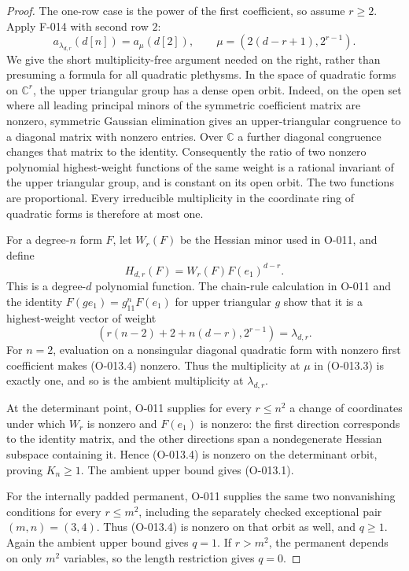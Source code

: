 \begin{proof}
The one-row case is the power of the first coefficient, so
assume $r\geq2$. Apply F-014 with second row $2$:
\[
 a_{\lambda_{d,r}}(d[n])=
 a_{\mu}(d[2]),\qquad
       \mu=(2(d-r+1),2^{r-1}).
                                                        \tag{O-013.3}
\]
We give the short multiplicity-free argument needed on the
right, rather than presuming a formula for all quadratic
plethysms. In the space of quadratic forms on $\mathbb C^r$,
the upper triangular group has a dense open orbit. Indeed,
on the open set where all leading principal minors of the
symmetric coefficient matrix are nonzero, symmetric Gaussian
elimination gives an upper-triangular congruence to a diagonal
matrix with nonzero entries. Over $\mathbb C$ a further
diagonal congruence changes that matrix to the identity.
Consequently the ratio of two nonzero polynomial highest-weight
functions of the same weight is a rational invariant of the
upper triangular group, and is constant on its open orbit.
The two functions are proportional. Every irreducible
multiplicity in the coordinate ring of quadratic forms is
therefore at most one.

For a degree-$n$ form $F$, let $W_r(F)$ be the Hessian minor
used in O-011, and define
\[
                  H_{d,r}(F)=W_r(F)F(e_1)^{d-r}.
                                                        \tag{O-013.4}
\]
This is a degree-$d$ polynomial function. The chain-rule
calculation in O-011 and the identity
$F(ge_1)=g_{11}^{n}F(e_1)$ for upper triangular $g$ show
that it is a highest-weight vector of weight
\[
  (r(n-2)+2+n(d-r),2^{r-1})=\lambda_{d,r}.
\]
For $n=2$, evaluation on a nonsingular diagonal quadratic
form with nonzero first coefficient makes (O-013.4) nonzero.
Thus the multiplicity at $\mu$ in (O-013.3) is exactly one,
and so is the ambient multiplicity at $\lambda_{d,r}$.

At the determinant point, O-011 supplies for every $r\leq n^2$
a change of coordinates under which $W_r$ is nonzero and
$F(e_1)$ is nonzero: the first direction corresponds to the
identity matrix, and the other directions span a nondegenerate
Hessian subspace containing it. Hence (O-013.4) is nonzero
on the determinant orbit, proving $K_n\geq1$. The ambient
upper bound gives (O-013.1).

For the internally padded permanent, O-011 supplies the same
two nonvanishing conditions for every $r\leq m^2$, including
the separately checked exceptional pair $(m,n)=(3,4)$.
Thus (O-013.4) is nonzero on that orbit as well, and
$q\geq1$. Again the ambient upper bound gives $q=1$.
If $r>m^2$, the permanent depends on only $m^2$ variables,
so the length restriction gives $q=0$.
\end{proof}

